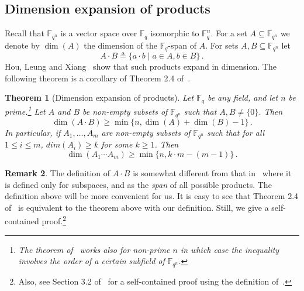 \documentclass[10pt]{article}
\newtheorem{theorem}{Theorem}[section]
\theoremstyle{definition}
\newtheorem{remark}[theorem]{Remark}
\numberwithin{equation}{section}
\newcommand{\F}{\mathbb F_q}
\newcommand{\Fn}{\mathbb F_{q^n}}
\begin{document}
\subsection{Dimension expansion of products}\label{sec:dim_exp}
Recall that $\Fn$ is a vector space
over $\F$ isomorphic to $\F^n$.
For a set $A\subseteq \mathbb{F}_{q^n}$ we denote by $\dim(A)$
the dimension of the $\F$-span of $A$.
For sets $A,B\subseteq \Fn$ let \[A\cdot B\triangleq \{a\cdot b\mid a\in A, b\in B\}\,.\]
Hou, Leung and Xiang~\cite{HLX02} show that such products expand in dimension.
 The following theorem is a corollary of Theorem 2.4 of~\cite{HLX02}.
\begin{theorem}[Dimension expansion of products]\label{thm-hlx}
Let $\F$ be any field, and let $n$ be prime.\footnote{The theorem
of~\cite{HLX02}
works also for non-prime $n$ in which case the inequality involves
the %
order of a certain subfield of $\Fn$.}
Let $A$ and $B$ be non-empty subsets of $\mathbb{F}_{q^n}$
such that $A,B\neq \{0\}$. Then
\[\dim(A\cdot B)\geq \min\{n,\dim(A)+\dim(B) -1\}\,.\]
In particular,
if $A_1,\ldots, A_m$ are non-empty subsets of $\mathbb{F}_{q^n}$
such that for all $1\leq i \leq m $, $dim(A_i)\geq k$ for some $k\geq 1$. Then
\[\dim(A_1\cdots A_m)\geq  \min\{n,k\cdot m - (m-1)\}\,.\]

\end{theorem}
\begin{remark}
The definition of $A\cdot B$ is somewhat different from that in~\cite{HLX02} where
it is defined only for subspaces, and as the \emph{span} of all possible products.
The definition above will be more convenient for us. It is easy to see
that Theorem 2.4 of~\cite{HLX02} %
%
%
%
is equivalent to
the theorem above with our definition.
Still, we give a self-contained proof.\footnote{Also, see Section 3.2 of~\cite{DG10}
for a self-contained proof using the definition of~\cite{HLX02}.}
\end{remark}
\end{document}
